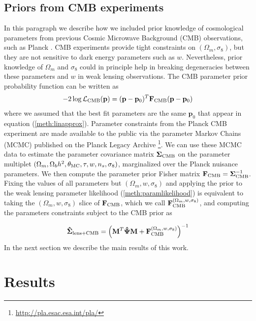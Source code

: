 \documentclass[reprint,aps,prd,superscriptaddress,showkeys,showpacs]{revtex4-1}
\newcommand{\bb}[1]{\mathbf{#1}}
\newcommand{\bbh}[1]{\mathbf{\hat{#1}}}
\begin{document}
\subsection{Priors from CMB experiments}
In this paragraph we describe how we included prior knowledge of cosmological parameters from previous Cosmic Microwave Background (CMB) observations, such as Planck \citep{PlanckCosmo}. CMB experiments provide tight constraints on $(\Omega_m,\sigma_8)$, but they are not sensitive to dark energy parameters such as $w$. Nevertheless, prior knowledge of $\Omega_m$ and $\sigma_8$ could in principle help in breaking degeneracies between these parameters and $w$ in weak lensing observations. The CMB parameter prior probability function can be written as 
\begin{equation}
-2\log\mathcal{L}_{\rm CMB}(\bb{p}) = (\bb{p} - \bb{p}_0)^T\bb{F}_{\rm CMB}(\bb{p} - \bb{p}_0)
\end{equation}
%
where we assumed that the best fit parameters are the same $\bb{p}_0$ that appear in equation (\ref{meth:linapprox}). 
Parameter constraints from the Planck CMB experiment are made available to the public via the parameter Markov Chains (MCMC) published on the Planck Legacy Archive \footnote{\url{http://pla.esac.esa.int/pla/}}. We can use these MCMC data to estimate the parameter covariance matrix $\bb{\Sigma}_{\rm CMB}$ on the parameter multiplet $(\Omega_m,\Omega_bh^2,\theta_{\rm MC},\tau,w,n_s,\sigma_8)$, marginalized over the Planck nuisance parameters. We then compute the parameter prior Fisher matrix $\bb{F}_{\rm CMB} = \bb{\Sigma}_{\rm CMB}^{-1}$. Fixing the values of all parameters but $(\Omega_m,w,\sigma_8)$ and applying the prior to the weak lensing parameter likelihood (\ref{meth:paramlikelihood}) is equivalent to taking the $(\Omega_m,w,\sigma_8)$ slice of $\bb{F}_{\rm CMB}$, which we call $\bb{F}_{\rm CMB}^{(\Omega_m,w,\sigma_8)}$, and computing the parameters constraints subject to the CMB prior as 

\begin{equation}
\label{meth:parcovestimator_cmb}
\bbh{\Sigma}_{\rm lens+CMB} = \left(\bb{M}^T\bbh{\Psi}\bb{M} + \bb{F}_{\rm CMB}^{(\Omega_m,w,\sigma_8)}\right)^{-1}
\end{equation}
%
In the next section we describe the main results of this work. 


\section{Results}
\end{document}
